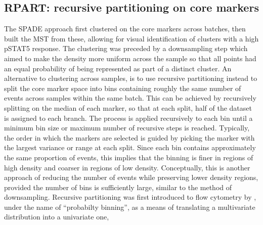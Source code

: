 \subsection{RPART: recursive partitioning on core markers} 

The \gls{SPADE} approach first clustered on the core markers across batches,
then built the \gls{MST} from these, allowing for visual identification of
clusters with a high pSTAT5 response.
The clustering was preceded by a downsampling step which aimed to make the density
more uniform across the sample so that all points had an equal probability of being
represented as part of a distinct cluster.  
An alternative to clustering across samples, is to use recursive partitioning instead to split the core marker space into bins containing roughly the same number of
events across samples within the same batch.
This can be achieved by recursively splitting on the median of each marker,
so that at each split, half of the dataset is assigned to each branch.
The process is applied recursively to each bin until a minimum bin size or maximum number of recursive steps is reached.  
Typically, the order in which the markers are selected is guided by picking the marker
with the largest variance or range at each split.
Since each bin contains approximately the same proportion of events,
this implies that the binning is finer in regions of high density and coarser in regions of low density.
Conceptually, this is another approach of reducing the number of events while preserving lower density regions,
provided the number of bins is sufficiently large,
similar to the method of downsampling.
Recursive partitioning was first introduced to flow cytometry by \citet{Roederer:2001tz},
under the name of ``probabilty binning'', as a means of translating a multivariate distribution into a univariate one,
